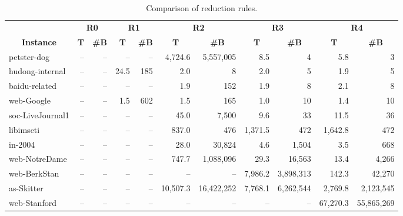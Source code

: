 \documentclass[11pt]{article}
\begin{document}
{
\begin{table}[p!]
\center
\caption{Comparison of reduction rules.}
\label{tbl:reduction_rules}
\fontsize{8pt}{0pt}\selectfont
\begin{tabular*}{\columnwidth}{@{\extracolsep{\fill}}l|rr|rr|rr|rr|rr}
\toprule
& \multicolumn{2}{c|}{\textbf{R0}}
& \multicolumn{2}{c|}{\textbf{R1}}
& \multicolumn{2}{c|}{\textbf{R2}}
& \multicolumn{2}{c|}{\textbf{R3}}
& \multicolumn{2}{c}{\textbf{R4}} \\
\multicolumn{1}{c|}{\textbf{Instance}} &
\multicolumn{1}{c}{\textbf{T}} & \multicolumn{1}{c|}{\textbf{\#B}} &
\multicolumn{1}{c}{\textbf{T}} & \multicolumn{1}{c|}{\textbf{\#B}} &
\multicolumn{1}{c}{\textbf{T}} & \multicolumn{1}{c|}{\textbf{\#B}} &
\multicolumn{1}{c}{\textbf{T}} & \multicolumn{1}{c|}{\textbf{\#B}} &
\multicolumn{1}{c}{\textbf{T}} & \multicolumn{1}{c}{\textbf{\#B}} \\
\midrule
petster-dog & -- & -- & -- & -- & 4,724.6 & 5,557,005 & 8.5 & 4 & 5.8 & 3 \\
hudong-internal & -- & -- & 24.5 & 185 & 2.0 & 8 & 2.0 & 5 & 1.9 & 5 \\
baidu-related & -- & -- & -- & -- & 1.9 & 152 & 1.9 & 8 & 2.1 & 8 \\
web-Google & -- & -- & 1.5 & 602 & 1.5 & 165 & 1.0 & 10 & 1.4 & 10 \\
soc-LiveJournal1 & -- & -- & -- & -- & 45.0 & 7,500 & 9.6 & 33 & 11.5 & 36 \\
libimseti & -- & -- & -- & -- & 837.0 & 476 & 1,371.5 & 472 & 1,642.8 & 472 \\
in-2004 & -- & -- & -- & -- & 28.0 & 30,824 & 4.6 & 1,504 & 3.5 & 668 \\
web-NotreDame & -- & -- & -- & -- & 747.7 & 1,088,096 & 29.3 & 16,563 & 13.4 & 4,266 \\
web-BerkStan & -- & -- & -- & -- & -- & -- & 7,986.2 & 3,898,313 & 142.3 & 42,270 \\
as-Skitter & -- & -- & -- & -- & 10,507.3 & 16,422,252 & 7,768.1 & 6,262,544 & 2,769.8 & 2,123,545 \\
web-Stanford & -- & -- & -- & -- & -- & -- & -- & -- & 67,270.3 & 55,865,269 \\
\bottomrule
\end{tabular*}
\end{table}
}
\end{document}
